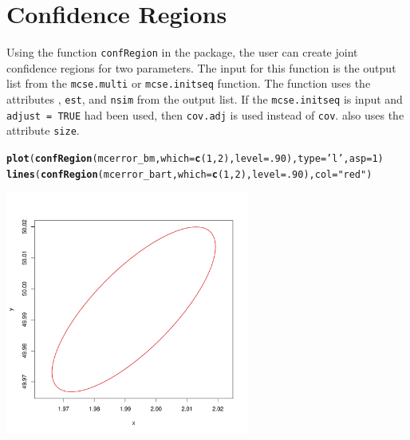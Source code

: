\documentclass[11pt]{article}\usepackage[]{graphicx}\usepackage[]{color}
\makeatletter
\def\maxwidth{ %
  \ifdim\Gin@nat@width>\linewidth
    \linewidth
  \else
    \Gin@nat@width
  \fi
}
\newcommand{\hlnum}[1]{\textcolor[rgb]{0.686,0.059,0.569}{#1}}%
\newcommand{\hlstr}[1]{\textcolor[rgb]{0.192,0.494,0.8}{#1}}%
\newcommand{\hlstd}[1]{\textcolor[rgb]{0.345,0.345,0.345}{#1}}%
\newcommand{\hlkwc}[1]{\textcolor[rgb]{0.333,0.667,0.333}{#1}}%
\newcommand{\hlkwd}[1]{\textcolor[rgb]{0.737,0.353,0.396}{\textbf{#1}}}%
\newenvironment{kframe}{%
 \def\at@end@of@kframe{}%
 \ifinner\ifhmode%
  \def\at@end@of@kframe{\end{minipage}}%
  \begin{minipage}{\columnwidth}%
 \fi\fi%
 \def\FrameCommand##1{\hskip\@totalleftmargin \hskip-\fboxsep
 \colorbox{shadecolor}{##1}\hskip-\fboxsep
     \hskip-\linewidth \hskip-\@totalleftmargin \hskip\columnwidth}%
 \MakeFramed {\advance\hsize-\width
   \@totalleftmargin\z@ \linewidth\hsize
   \@setminipage}}%
 {\par\unskip\endMakeFramed%
 \at@end@of@kframe}
\newenvironment{knitrout}{}{} %
\makeatother
\begin{document}
\bigskip
\section{Confidence Regions}

Using the function \texttt{confRegion} in the package, the user can create joint confidence regions for two parameters. The input for this function is the output list from the \texttt{mcse.multi} or \texttt{mcse.initseq} function. The function uses the attributes , \texttt{est}, and \texttt{nsim} from the output list. If the \texttt{mcse.initseq} is input and \texttt{adjust = TRUE} had been used, then \texttt{cov.adj} is used instead of \texttt{cov}.  also uses the attribute \texttt{size}.

\begin{knitrout}
\color{fgcolor}\begin{kframe}
\begin{alltt}
\hlkwd{plot}\hlstd{(}\hlkwd{confRegion}\hlstd{(mcerror_bm,} \hlkwc{which} \hlstd{=} \hlkwd{c}\hlstd{(}\hlnum{1}\hlstd{,}\hlnum{2}\hlstd{),} \hlkwc{level} \hlstd{=} \hlnum{.90}\hlstd{),} \hlkwc{type} \hlstd{=} \hlstr{'l'}\hlstd{,} \hlkwc{asp} \hlstd{=} \hlnum{1}\hlstd{)}
\hlkwd{lines}\hlstd{(}\hlkwd{confRegion}\hlstd{(mcerror_bart,} \hlkwc{which} \hlstd{=} \hlkwd{c}\hlstd{(}\hlnum{1}\hlstd{,}\hlnum{2}\hlstd{),} \hlkwc{level} \hlstd{=} \hlnum{.90}\hlstd{),} \hlkwc{col} \hlstd{=} \hlstr{"red"}\hlstd{)}
\end{alltt}
\end{kframe}
\includegraphics[width=\maxwidth,height=8cm]{figure/confRegion-1} 

\end{knitrout}
\end{document}
